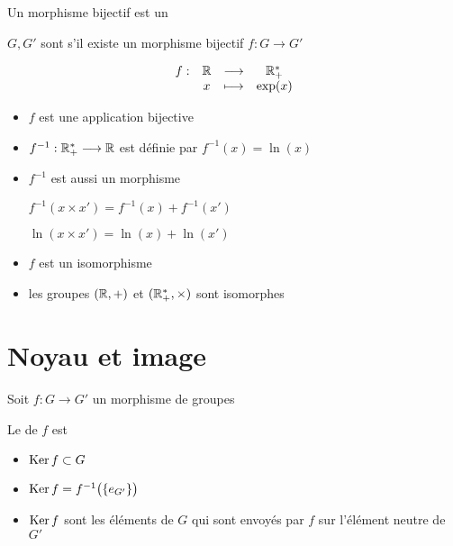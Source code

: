 \begin{frame}
\begin{mydefinition}
Un morphisme bijectif est un 

$G, G'$ sont 
s'il existe un morphisme bijectif $f : G \longrightarrow G'$
\end{mydefinition}
\pause
\begin{exemple}
$$
\begin{array}{lccc}
f : & \mathbb{R} & \longrightarrow & \mathbb{R}^*_+ \\
    & x  & \longmapsto & \exp(x) \\
\end{array}
$$
\pause
\begin{itemize}
  \item $f$ est une application bijective
\pause
  \item $f^{-1} :  \mathbb{R}_+^* \longrightarrow \mathbb{R}$ est définie par $f^{-1}(x) = \ln(x)$
\pause
  \item $f^{-1}$ est aussi un morphisme

$f^{-1}(x\times x')=f^{-1}(x) + f^{-1}(x')$

$\ln(x \times x') = \ln(x) + \ln(x')$
\pause
  \item $f$ est un isomorphisme
  \item les groupes $(\mathbb{R},+)$ et $(\mathbb{R}_+^*,\times)$ sont
isomorphes
\end{itemize}
\end{exemple}
  
\end{frame}



\section{Noyau et image}


\begin{frame}
Soit $f: G \longrightarrow G'$ un morphisme de groupes
\medskip

\begin{mydefinition}
Le  de $f$ est 
\end{mydefinition}

\pause
\bigskip

\begin{itemize}
  \item $\mathop{\text{Ker}}\nolimits f \subset G$
\pause
  \item $\mathop{\text{Ker}}\nolimits f = f^{-1}\big(\{ e_{G'} \}\big)$
\pause
  \item $\mathop{\text{Ker}}\nolimits f$ sont les éléments de $G$ qui sont envoyés 
par $f$ sur l'élément neutre de $G'$
\end{itemize}  


\end{frame}

